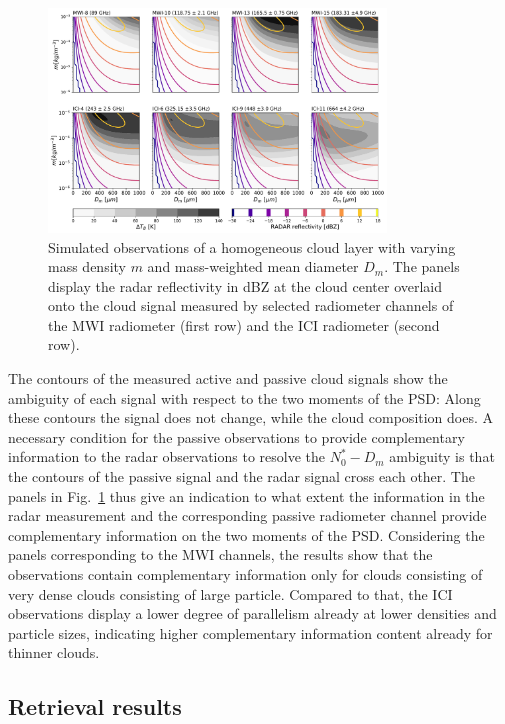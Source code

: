 \documentclass[journal abbreviation, manuscript]{copernicus}
\begin{document}
\begin{figure}
\centering
\includegraphics[width = 0.8\textwidth]{../plots/contours}
\caption{Simulated observations of a homogeneous cloud layer with
varying mass density $m$ and mass-weighted mean diameter $D_m$. The panels
display the radar reflectivity in dBZ at the cloud center overlaid onto the
cloud signal measured by selected radiometer channels of the MWI radiometer
(first row) and the ICI radiometer (second row).}
\label{fig:isolines}
\end{figure}

The contours of the measured active and passive cloud signals show the ambiguity
of each signal with respect to the two moments of the PSD: Along these contours
the signal does not change, while the cloud composition does. A necessary
condition for the passive observations to provide complementary information to
the radar observations to resolve the $N_0^*-D_m$ ambiguity is that the contours
of the passive signal and the radar signal cross each other. The panels in
Fig.~\ref{fig:isolines} thus give an indication to what extent the information
in the radar measurement and the corresponding passive radiometer channel
provide complementary information on the two moments of the PSD. Considering the
panels corresponding to the MWI channels, the results show that the observations
contain complementary information only for clouds consisting of very dense
clouds consisting of large particle. Compared to that, the ICI observations
display a lower degree of parallelism already at lower densities and particle
sizes, indicating higher complementary information content already for thinner
clouds.

\subsection{Retrieval results}
\end{document}
